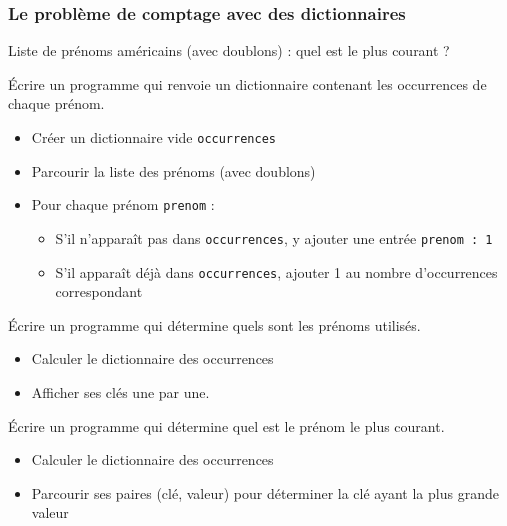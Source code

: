 \documentclass[x11names,svgnames]{beamer}
\begin{document}
\begin{frame}
  \frametitle{Le problème de comptage avec des dictionnaires}
  Liste de prénoms américains (avec doublons) : quel est le plus courant ?

  \begin{overprint}
  \MVRightarrow{} Écrire un programme qui renvoie un dictionnaire contenant les occurrences de chaque prénom.

  \begin{itemize}
  \item Créer un dictionnaire vide \texttt{occurrences}
  \item Parcourir la liste des prénoms (avec doublons)
  \item Pour chaque prénom \texttt{prenom} :
    \begin{itemize}
    \item S'il n'apparaît pas dans \texttt{occurrences}, y ajouter une entrée \texttt{prenom : 1}
    \item S'il apparaît déjà dans \texttt{occurrences}, ajouter 1 au nombre d'occurrences correspondant
    \end{itemize}
  \end{itemize}
  \MVRightarrow{} Écrire un programme qui détermine quels sont les prénoms utilisés.

  \begin{itemize}
  \item Calculer le dictionnaire des occurrences
  \item Afficher ses clés une par une.
  \end{itemize}
  \MVRightarrow{} Écrire un programme qui détermine quel est le prénom le plus courant.
  \begin{itemize}
  \item Calculer le dictionnaire des occurrences
  \item Parcourir ses paires (clé, valeur) pour déterminer la clé ayant la plus grande valeur
  \end{itemize}
\end{overprint}
\end{frame}
\end{document}
